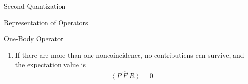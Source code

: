 \documentclass[twoside,english]{uiofysmaster}
\begin{document}
\begin{chapter}{Second Quantization}
\begin{section}{Representation of Operators}
\begin{subsection}{One-Body Operator}
\begin{enumerate}
				\begin{align}
					(p = r), \: (s = q), \: ..., \: (n \neq m), \: ..., \: (N = N)
				\end{align}
				we can rewrite the expectation value as
				\begin{align}
					\sum_{pq} f_{pq} \left< 0 \right| \hat a_M ... \hat a_s \hat a_r (\hat a_k^\dagger \hat a_l) \hat a_p^\dagger \hat a_q^\dagger ... \hat a_N^\dagger \left| 0 \right> = (-1)^{\sigma(P)} f_{mn}
				\end{align}
				Because the operators $\hat a_k^\dagger$ and $\hat a_l$ must be paired with the non-identical states $m$ and $n$ for us to be left with a orthogonal inner product.
				\item If there are more than one noncoincidence, no contributions can survive, and the expectation value is 
				\begin{align}
					\left< P \right| \hat F \left| R \right> = 0
				\end{align}
			\end{enumerate}
		\end{subsection}


\end{section}
\end{chapter}
\end{document}
